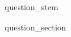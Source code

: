 \begin{question}
    {{ question_stem }}

    \begin{itemize}
        {{question_section}}
    \end{itemize}
\end{question}